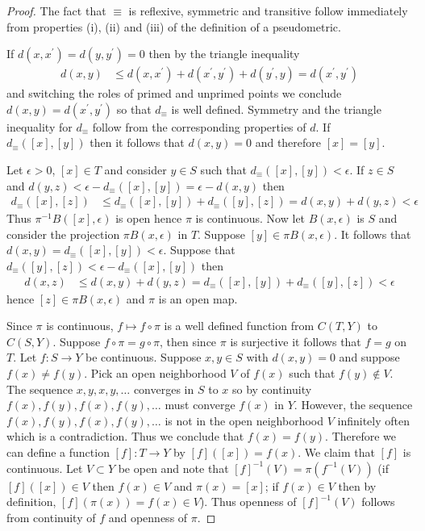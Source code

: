\begin{proof}
The fact that $\equiv$ is reflexive, symmetric and transitive follow immediately from properties (i), (ii) and (iii) of the definition of a pseudometric.

If $d(x,x^\prime) = d(y,y^\prime) = 0$ then by the triangle inequality
\begin{align*}
d(x,y) &\leq d(x, x^\prime) + d(x^\prime, y^\prime) + d(y^\prime, y) = d(x^\prime, y^\prime)
\end{align*}
and switching the roles of primed and unprimed points we conclude $d(x,y)=d(x^\prime,y^\prime)$ so that $d_\equiv$ is well defined.  Symmetry and the triangle inequality for $d_\equiv$ follow from
the corresponding properties of $d$.  If $d_\equiv([x], [y])$ then it follows that $d(x,y) = 0$ and therefore $[x]=[y]$.

Let $\epsilon > 0$, $[x] \in T$ and consider $y \in S$ such that $d_\equiv([x], [y]) < \epsilon$.  If $z \in S$ and $d(y,z) < \epsilon-d_\equiv([x], [y]) = \epsilon - d(x,y)$ then 
\begin{align*}
d_\equiv([x], [z]) &\leq d_\equiv([x], [y]) + d_\equiv([y], [z]) = d(x,y) + d(y,z) < \epsilon
\end{align*}
Thus $\pi^{-1} B([x], \epsilon)$ is open hence $\pi$ is continuous.   Now let $B(x,\epsilon)$ is $S$ and consider the projection $\pi B(x,\epsilon)$ in $T$.  Suppose $[y] \in \pi B(x,\epsilon)$.  It follows that $d(x,y) = d_\equiv([x], [y]) < \epsilon$.  Suppose that $d_\equiv([y], [z]) < \epsilon - d_\equiv([x], [y])$ then
\begin{align*}
d(x,z) &\leq d(x,y) + d(y,z) =  d_\equiv([x], [y]) + d_\equiv([y], [z]) < \epsilon
\end{align*}
hence $[z] \in \pi B(x,\epsilon)$ and $\pi$ is an open map.

Since $\pi$ is continuous, $f \mapsto f \circ \pi$ is a well defined function from $C(T, Y)$ to $C(S, Y)$.  Suppose $f \circ \pi = g \circ \pi$, then since $\pi$ is surjective it follows that $f = g$ on $T$.  Let $f : S \to Y$ be continuous.  Suppose $x, y \in S$ with $d(x,y)=0$ and suppose $f(x) \neq f(y)$.  Pick an open neighborhood $V$ of $f(x)$ such that $f(y) \notin V$.   The sequence $x,y,x,y, \dotsc$ converges in $S$ to $x$ so by continuity $f(x), f(y), f(x), f(y), \dotsc$ must converge $f(x)$ in $Y$.  However, the sequence $f(x), f(y), f(x), f(y), \dotsc$ is not in the open neighborhood $V$ infinitely often which is a contradiction.  Thus we conclude that $f(x)=f(y)$.  Therefore we can define a function $[f] : T \to Y$ by $[f]([x]) = f(x)$.  We claim that $[f]$ is continuous.  Let $V \subset Y$ be open and note that $[f]^{-1}(V) = \pi (f^{-1}(V))$ (if $[f]([x]) \in V$ then $f(x) \in V$ and $\pi(x) = [x]$; if $f(x) \in V$ then by definition, $[f](\pi(x)) = f(x) \in V$).   Thus openness of $[f]^{-1}(V)$ follows from continuity of $f$ and openness of $\pi$.


\end{proof}
